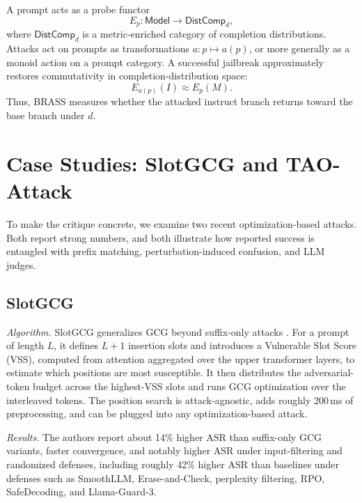 \documentclass[conference]{IEEEtran}
\newcommand{\Model}{\mathsf{Model}}
\newcommand{\DistComp}{\mathsf{DistComp}}
\begin{document}
A prompt acts as a probe functor
\begin{equation}
    E_p:\Model \to \DistComp_d,
\end{equation}
where \(\DistComp_d\) is a metric-enriched category of completion distributions. Attacks act on prompts as transformations \(a:p\mapsto a(p)\), or more generally as a monoid action on a prompt category. A successful jailbreak approximately restores commutativity in completion-distribution space:
\begin{equation}
    E_{a(p)}(I) \approx E_p(M).
\end{equation}
Thus, BRASS measures whether the attacked instruct branch returns toward the base branch under \(d\).

\section{Case Studies: SlotGCG and TAO-Attack}
\label{sec:case-studies}

To make the critique concrete, we examine two recent optimization-based attacks. Both report strong numbers, and both illustrate how reported success is entangled with prefix matching, perturbation-induced confusion, and LLM judges.

\subsection{SlotGCG}

\emph{Algorithm.} SlotGCG generalizes GCG beyond suffix-only attacks \cite{slotgcg2024}. For a prompt of length \(L\), it defines \(L+1\) insertion slots and introduces a Vulnerable Slot Score (VSS), computed from attention aggregated over the upper transformer layers, to estimate which positions are most susceptible. It then distributes the adversarial-token budget across the highest-VSS slots and runs GCG optimization over the interleaved tokens. The position search is attack-agnostic, adds roughly 200\,ms of preprocessing, and can be plugged into any optimization-based attack.

\emph{Results.} The authors report about 14\% higher ASR than suffix-only GCG variants, faster convergence, and notably higher ASR under input-filtering and randomized defenses, including roughly 42\% higher ASR than baselines under defenses such as SmoothLLM, Erase-and-Check, perplexity filtering, RPO, SafeDecoding, and Llama-Guard-3.
\end{document}
